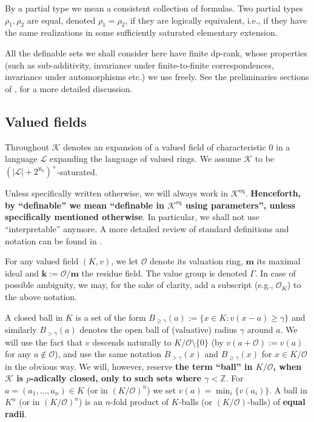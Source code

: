 \documentclass[11pt]{amsart}
\DeclareMathOperator{\eq}{eq}
\theoremstyle{definition}
\newcommand{\Zz}{{\mathbb {Z}}}
\newcommand{\m}{\textbf{m}}
\newcommand{\bk}{\textbf{k}}
\newcommand{\CL}{{\mathcal L}}
\newcommand{\CK}{{\mathcal K}}
\newcommand{\CO}{{\mathcal O}}
\newcommand{\0}{\emptyset}
\begin{document}
By a partial type we mean a consistent collection of formulas. Two partial types $\rho_1, \rho_2$ are equal, denoted $\rho_1=\rho_2$, if they are logically equivalent, i.e., if they have the same realizations in some sufficiently saturated elementary extension.

All the definable sets we shall consider here have finite dp-rank, whose properties  (such as sub-additivity, invariance under finite-to-finite correspondences, invariance under automorphisms etc.) we use freely. See the preliminaries sections of \cite{HaHaPeVF},\cite{HaHaPeGps} for a more detailed discussion. 


\subsection{Valued fields}
Throughout $\CK$ denotes an expansion of a  valued  field of characteristic $0$ in a language $\CL$ expanding the language of valued rings. We assume $\CK$ to be  $(|\CL|+2^{\aleph_0})^+$-saturated.



Unless specifically written otherwise, we will always work in $\CK^{\eq}$.  
{\bf Henceforth, by ``definable'' we mean ``definable in $\CK^{\eq}$ using parameters'', unless specifically mentioned otherwise}. In particular, we shall not use ``interpretable'' anymore. A more detailed review of standard definitions and notation can be found in \cite[\S 2]{HaHaPeGps}. 

 

For any valued field $(K,v)$, we let $\CO$ denote its valuation ring,  $\m$ its maximal ideal and $\bk:=\CO/\m$ the residue field. The value group is denoted $\Gamma$. In case of possible ambiguity, we may, for the sake of clarity, add a subscript (e.g., $\CO_K$) to the above notation.


A closed ball in $K$ is a set of the form $B_{\geq \gamma}(a):=\{x\in K: v(x-a)\geq \gamma\}$ and similarly $B_{>\gamma}(a)$ denotes the open ball of (valuative) radius $\gamma$ around $a$. We will use the fact that $v$ descends naturally to $K/\CO\setminus \{0\}$ (by $v(a+\CO):=v(a)$ for any $a\notin \CO$), and use the same notation $B_{>\gamma}(x)$ and $B_{\ge \gamma}(x)$ for $x\in K/\CO$ in the obvious way. We will, however, reserve \textbf{the term ``ball'' in $K/\CO$, when $\CK$ is $p$-adically closed, only to  such sets where $\gamma<\Zz$}.   For $a=(a_1,\dots,a_n)\in K$ (or in $(K/\CO)^n$) we set $v(a)=\min_i\{v(a_i)\}$. A ball in $K^n$ (or in $(K/\CO)^n$) is an $n$-fold  product of $K$-balls (or $(K/\CO)$-balls) of {\bf equal radii}. 
\end{document}
